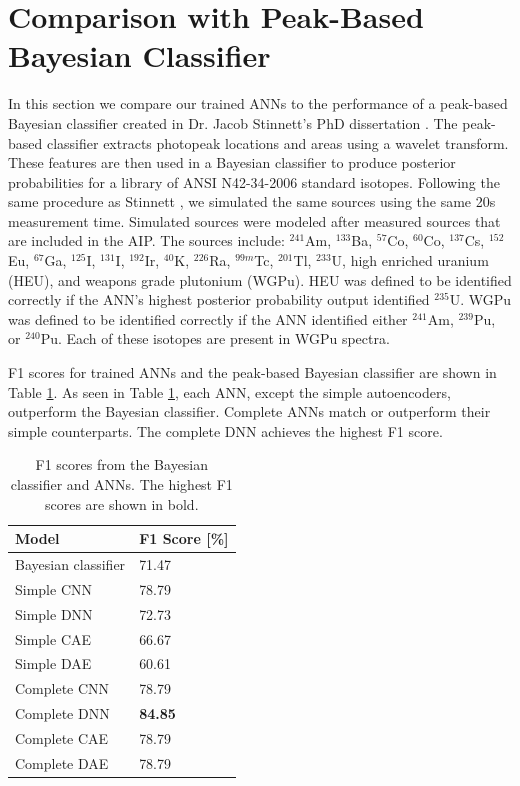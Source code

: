 \section{Comparison with Peak-Based Bayesian Classifier}

In this section we compare our trained ANNs to the performance of a peak-based Bayesian classifier created in Dr. Jacob Stinnett's PhD dissertation \cite{stinnett2016}. The peak-based classifier extracts photopeak locations and areas using a wavelet transform. These features are then used in a Bayesian classifier to produce posterior probabilities for a library of ANSI N42-34-2006 standard isotopes. Following the same procedure as Stinnett \cite{stinnett2016}, we simulated the same sources using the same 20s measurement time. Simulated sources were modeled after measured sources that are included in the AIP. The sources include: $^{241}$Am, $^{133}$Ba, $^{57}$Co, $^{60}$Co, $^{137}$Cs, $^{152}$Eu, $^{67}$Ga, $^{125}$I, $^{131}$I, $^{192}$Ir, $^{40}$K, $^{226}$Ra, $^{99m}$Tc, $^{201}$Tl, $^{233}$U, high enriched uranium (HEU), and weapons grade plutonium (WGPu). HEU was defined to be identified correctly if the ANN's highest posterior probability output identified $^{235}$U. WGPu was defined to be identified correctly if the ANN identified either $^{241}$Am, $^{239}$Pu, or $^{240}$Pu. Each of these isotopes are present in WGPu spectra.

F1 scores for trained ANNs and the peak-based Bayesian classifier are shown in Table \ref{table:jacob_compare}. As seen in Table \ref{table:jacob_compare}, each ANN, except the simple autoencoders, outperform the Bayesian classifier. Complete ANNs match or outperform their simple counterparts. The complete DNN achieves the highest F1 score. 

\begin{table}[H]
	\centering
	\caption{F1 scores from the Bayesian classifier and ANNs. The highest F1 scores are shown in bold.}
	\label{table:jacob_compare}
	\begin{tabular}{ll}
		\hline
		\textbf{Model} &  \textbf{F1 Score [\%]} \\ \hline
		Bayesian classifier & 71.47 \\ 
		Simple CNN & 78.79 \\ 
		Simple DNN & 72.73 \\ 
		Simple CAE & 66.67 \\ 		
		Simple DAE & 60.61 \\ 
		Complete CNN & 78.79 \\ 
		Complete DNN & \textbf{84.85} \\ 
		Complete CAE & 78.79 \\ 
		Complete DAE & 78.79 \\ \hline
	\end{tabular}
\end{table}

